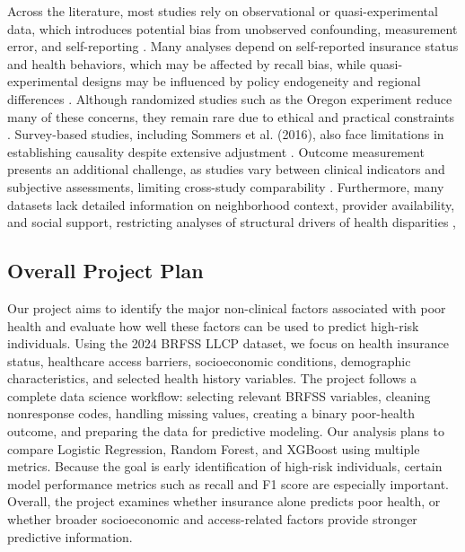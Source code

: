 Across the literature, most studies rely on observational or quasi-experimental data, which introduces potential bias from unobserved confounding, measurement error, and self-reporting \cite{Kronick_2009}. Many analyses depend on self-reported insurance status and health behaviors, which may be affected by recall bias, while quasi-experimental designs may be influenced by policy endogeneity and regional differences \cite{Sommers2017InsuranceHealth}. Although randomized studies such as the Oregon experiment reduce many of these concerns, they remain rare due to ethical and practical constraints \cite{doi:10.1056/NEJMsa1212321}. Survey-based studies, including Sommers et al. (2016), also face limitations in establishing causality despite extensive adjustment \cite{Sommers_Blendon_Orav_Epstein_2016}. Outcome measurement presents an additional challenge, as studies vary between clinical indicators and subjective assessments, limiting cross-study comparability \cite{Clark_Ommerborn_Moran_Brooks_Haas_Bates_Wright_2021}. Furthermore, many datasets lack detailed information on neighborhood context, provider availability, and social support, restricting analyses of structural drivers of health disparities \cite{XIE20251412}, \cite{Benitez_Freed_Huang_Oladele_2024}

\subsection{Overall Project Plan}

Our project aims to identify the major non-clinical factors associated with poor health and evaluate how well these factors can be used to predict high-risk individuals. Using the 2024 BRFSS LLCP dataset, we focus on health insurance status, healthcare access barriers, socioeconomic conditions, demographic characteristics, and selected health history variables. The project follows a complete data science workflow: selecting relevant BRFSS variables, cleaning nonresponse codes, handling missing values, creating a binary poor-health outcome, and preparing the data for predictive modeling. Our analysis plans to compare Logistic Regression, Random Forest, and XGBoost using multiple metrics. Because the goal is early identification of high-risk individuals, certain model performance metrics such as recall and F1 score are especially important. Overall, the project examines whether insurance alone predicts poor health, or whether broader socioeconomic and access-related factors provide stronger predictive information.

